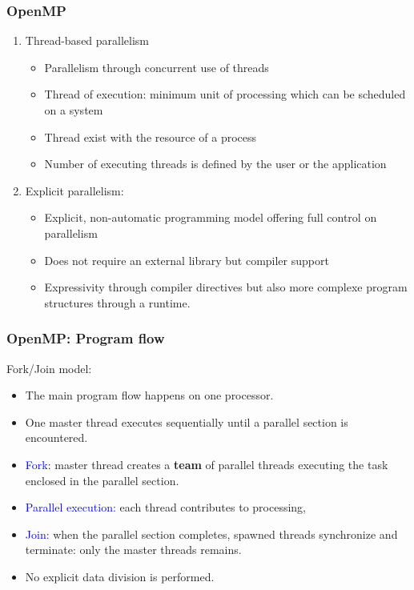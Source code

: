 \begin{frame}
\frametitle{OpenMP}

\begin{enumerate}
\item Thread-based parallelism
\begin{itemize}
  \item  Parallelism through concurrent use of threads
  \item  Thread of execution: minimum unit of processing which can be scheduled on a system
  \item  Thread exist with the resource of a process
  \item  Number of executing threads is defined by the user or the application
\end{itemize}
\bigskip
\item Explicit parallelism:
\begin{itemize}
  \item  Explicit, non-automatic programming model offering full control on parallelism
  \item  Does not require an external library but compiler support
  \item  Expressivity through compiler directives but also more complexe program structures through a runtime.
\end{itemize}
\end{enumerate}

\end{frame}

\begin{frame}
  \frametitle{OpenMP: Program flow}
  \begin{center}
    \scalebox{0.8}{}
  \end{center}
Fork/Join model:
  \begin{itemize}
  \item The main program flow happens on one processor.
  \item One master thread executes sequentially until a parallel section is encountered.
  \item \textcolor{blue}{Fork}: master thread creates a \textbf{team} of parallel threads executing the task enclosed in the parallel section.
  \item \textcolor{blue}{Parallel execution:} each thread contributes to processing,
  \item \textcolor{blue}{Join:} when the parallel section completes, spawned threads synchronize and terminate: only the master threads remains.
  \item No explicit data division is performed.
  \end{itemize}
\end{frame}

